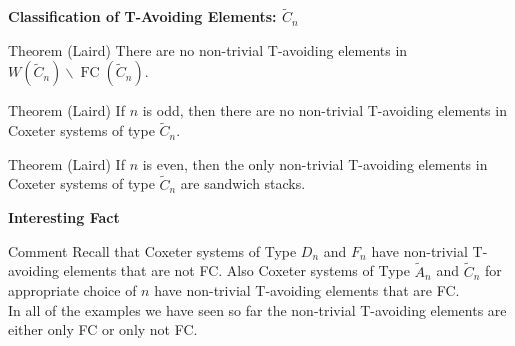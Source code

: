 \documentclass{beamer}
\DeclareMathOperator{\FC}{FC}
\newcommand{\C}{\widetilde{C}}
\begin{document}


\begin{frame}{\textbf{Classification of T-Avoiding Elements: $\C_n$}}

\begin{block}{Theorem (Laird)}
	There are no non-trivial T-avoiding elements in $W(\C_n)\backslash\FC(\C_n)$.
\end{block}
\pause
\begin{block}{Theorem (Laird)}
	If $n$ is odd, then there are no non-trivial T-avoiding elements in Coxeter systems of type $\C_n$.
\end{block}
\pause
\begin{block}{Theorem (Laird)}
	If $n$ is even, then the only non-trivial T-avoiding elements in Coxeter systems of type $\C_n$ are sandwich stacks.
\end{block}
	
\end{frame}




\begin{frame}{\textbf{Interesting Fact}}
\begin{block}{Comment}
Recall that Coxeter systems of Type $D_n$ and $F_n$ have non-trivial T-avoiding elements that are not FC. Also Coxeter systems of Type $\widetilde{A}_n$ and $\C_n$ for appropriate choice of $n$ have non-trivial T-avoiding elements that are FC. \\
\vspace{1em}
In all of the examples we have seen so far the non-trivial T-avoiding elements are either only FC or only not FC.	
\end{block}

	
\end{frame}
\end{document}

